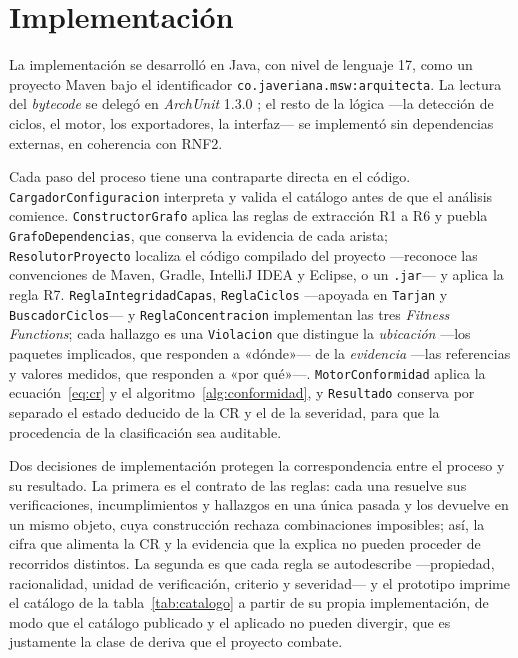 \section{Implementación}
\label{sec:implementacion}
La implementación se desarrolló en Java, con nivel de lenguaje 17, como un proyecto Maven bajo el identificador \texttt{co.javeriana.msw:arquitecta}. La lectura del \textit{bytecode} se delegó en \textit{ArchUnit} 1.3.0 \citep{ArchUnit}; el resto de la lógica ---la detección de ciclos, el motor, los exportadores, la interfaz--- se implementó sin dependencias externas, en coherencia con RNF2.

Cada paso del proceso tiene una contraparte directa en el código. \texttt{CargadorConfiguracion} interpreta y valida el catálogo antes de que el análisis comience. \texttt{ConstructorGrafo} aplica las reglas de extracción R1 a R6 y puebla \texttt{GrafoDependencias}, que conserva la evidencia de cada arista; \texttt{ResolutorProyecto} localiza el código compilado del proyecto ---reconoce las convenciones de Maven, Gradle, IntelliJ IDEA y Eclipse, o un \texttt{.jar}--- y aplica la regla R7. \texttt{ReglaIntegridadCapas}, \texttt{ReglaCiclos} ---apoyada en \texttt{Tarjan} y \texttt{BuscadorCiclos}--- y \texttt{ReglaConcentracion} implementan las tres \textit{Fitness Functions}; cada hallazgo es una \texttt{Violacion} que distingue la \textit{ubicación} ---los paquetes implicados, que responden a «dónde»--- de la \textit{evidencia} ---las referencias y valores medidos, que responden a «por qué»---. \texttt{MotorConformidad} aplica la ecuación~\ref{eq:cr} y el algoritmo~\ref{alg:conformidad}, y \texttt{Resultado} conserva por separado el estado deducido de la CR y el de la severidad, para que la procedencia de la clasificación sea auditable.

Dos decisiones de implementación protegen la correspondencia entre el proceso y su resultado. La primera es el contrato de las reglas: cada una resuelve sus verificaciones, incumplimientos y hallazgos en una única pasada y los devuelve en un mismo objeto, cuya construcción rechaza combinaciones imposibles; así, la cifra que alimenta la CR y la evidencia que la explica no pueden proceder de recorridos distintos. La segunda es que cada regla se autodescribe ---propiedad, racionalidad, unidad de verificación, criterio y severidad--- y el prototipo imprime el catálogo de la tabla~\ref{tab:catalogo} a partir de su propia implementación, de modo que el catálogo publicado y el aplicado no pueden divergir, que es justamente la clase de deriva que el proyecto combate.

